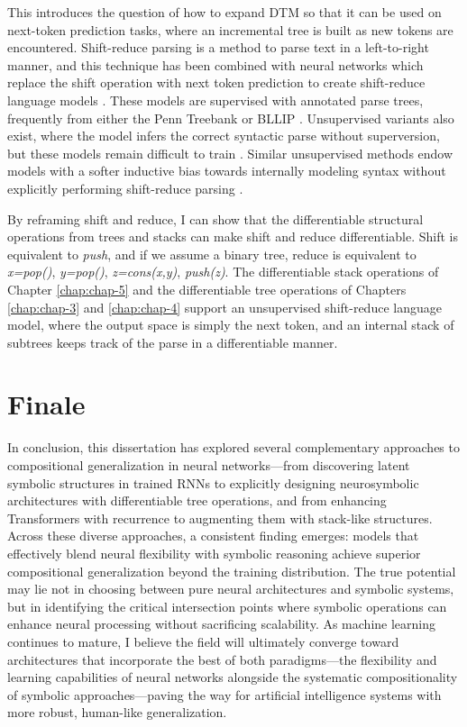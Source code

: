This introduces the question of how to expand DTM so that it can be used on next-token prediction tasks, where an incremental tree is built as new tokens are encountered. Shift-reduce parsing is a method to parse text in a left-to-right manner, and this technique has been combined with neural networks which replace the shift operation with next token prediction to create shift-reduce language models \citep{dyer_recurrent_2016, choe_parsing_2016, qian_structural_2021}. These models are supervised with annotated parse trees, frequently from either the Penn Treebank \citep{marcus-etal-1993-building} or BLLIP \citep{charniak2000bllip}. Unsupervised variants also exist, where the model infers the correct syntactic parse without superversion, but these models remain difficult to train \citep{kim_unsupervised_2019, buys_neural_2018,hu_generative_2024}. Similar unsupervised methods endow models with a softer inductive bias towards internally modeling syntax without explicitly performing shift-reduce parsing \citep{bowman_fast_2016,shen_ordered_2019,drozdov_unsupervised_2019}.

By reframing shift and reduce, I can show that the differentiable structural operations from trees and stacks can make shift and reduce differentiable. Shift is equivalent to \textit{push}, and if we assume a binary tree, reduce is equivalent to \textit{x=pop()}, \textit{y=pop()}, \textit{z=cons(x,y)}, \textit{push(z)}. The differentiable stack operations of Chapter \ref{chap:chap-5} and the differentiable tree operations of Chapters \ref{chap:chap-3} and \ref{chap:chap-4} support an unsupervised shift-reduce language model, where the output space is simply the next token, and an internal stack of subtrees keeps track of the parse in a differentiable manner.

\section{Finale}
In conclusion, this dissertation has explored several complementary approaches to compositional generalization in neural networks—from discovering latent symbolic structures in trained RNNs to explicitly designing neurosymbolic architectures with differentiable tree operations, and from enhancing Transformers with recurrence to augmenting them with stack-like structures. Across these diverse approaches, a consistent finding emerges: models that effectively blend neural flexibility with symbolic reasoning achieve superior compositional generalization beyond the training distribution. The true potential may lie not in choosing between pure neural architectures and symbolic systems, but in identifying the critical intersection points where symbolic operations can enhance neural processing without sacrificing scalability. As machine learning continues to mature, I believe the field will ultimately converge toward architectures that incorporate the best of both paradigms—the flexibility and learning capabilities of neural networks alongside the systematic compositionality of symbolic approaches—paving the way for artificial intelligence systems with more robust, human-like generalization.
